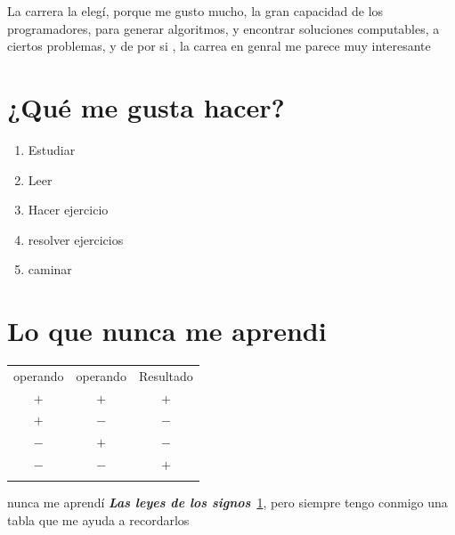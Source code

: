 La carrera la elegí, porque me gusto mucho, la gran capacidad de los programadores, para generar algoritmos, y encontrar soluciones computables, a ciertos problemas, y de por si , la carrea en genral me parece muy interesante


\section{¿Qué me gusta hacer?}

\begin{enumerate}
\item Estudiar
\item Leer
\item Hacer ejercicio
\item resolver ejercicios
\item caminar
\end{enumerate}

\section {Lo que nunca me aprendi}

\begin{table}[h]
  \centering
  \begin{tabular} {c c c}
    \hline
    operando & operando & Resultado\\

    $+$ & $+$ & $+$\\
    $+$ & $-$ & $-$\\
    $-$ & $+$ & $-$\\
    $-$ & $-$ & $+$\\

    \label{No}
    
  \end{tabular}
\end{table}

nunca me aprendí \emph{\textbf{ Las leyes de los signos}}~\ref{No}, pero siempre tengo conmigo una tabla que me ayuda a recordarlos
